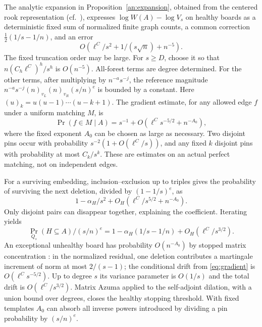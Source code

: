 \documentclass[11pt]{article}
\theoremstyle{definition}\newtheorem{definition}[theorem]{Definition}
\begin{document}
The analytic expansion in Proposition~\ref{an:expansion}, obtained from the centered rook representation (cf.\ \cite[Sec.~3]{DW}), expresses $\log W(A)-\log V_s$ on healthy boards as a deterministic fixed sum of normalized finite graph counts, a common correction $\tfrac12(1/s-1/n)$, and an error
\begin{equation}\label{eq:residual}
 O\!\left(\ell^{C}/s^2+1/(s\sqrt n)+n^{-5}\right).
\end{equation}
The fixed truncation order may be large. For $s\ge D$, choose it so that $n(C_h\ell^{C})^h/s^h$ is $O(n^{-5})$. All-forest terms are degree determined. For the other terms, after multiplying by $n^{-a}s^{-j}$, the reference magnitude $n^{-a}s^{-j}(n)_{v_L}(n)_{v_R}(s/n)^e$ is bounded by a constant. Here $(u)_k=u(u-1)\cdots(u-k+1)$. The gradient estimate, for any allowed edge $f$ under a uniform matching $M$, is
\begin{equation}\label{eq:gradient}
 \Pr(f\in M\mid A)=s^{-1}+O(\ell^Cs^{-5/2}+n^{-A_0}),
\end{equation}
where the fixed exponent $A_0$ can be chosen as large as necessary. Two disjoint pins occur with probability $s^{-2}(1+O(\ell^C/s))$, and any fixed $k$ disjoint pins with probability at most $C_k/s^k$. These are estimates on an actual perfect matching, not on independent edges.

For a surviving embedding, inclusion--exclusion up to triples gives the probability of surviving the next deletion, divided by $(1-1/s)^e$, as
\[
  1-\alpha_H/s^2+O_H(\ell^C/s^{5/2}+n^{-A_0}).
\]
Only disjoint pairs can disappear together, explaining the coefficient. Iterating yields
\begin{equation}\label{eq:surv}
 \Pr_{Q_s}(H\subseteq A)/(s/n)^e
       =1-\alpha_H(1/s-1/n)+O_H(\ell^C/s^{3/2}).
\end{equation}
An exceptional unhealthy board has probability $O(n^{-A_0})$ by stopped matrix concentration \cite[Cor.~7.5]{Tropp}: in the normalized residual, one deletion contributes a martingale increment of norm at most $2/(s-1)$; the conditional drift from \eqref{eq:gradient} is $O(\ell^C s^{-5/2})$. Up to degree $s$ its variance parameter is $O(1/s)$ and the total drift is $O(\ell^C/s^{3/2})$. Matrix Azuma applied to the self-adjoint dilation, with a union bound over degrees, closes the healthy stopping threshold. With fixed templates $A_0$ can absorb all inverse powers introduced by dividing a pin probability by $(s/n)^e$.
\end{document}
